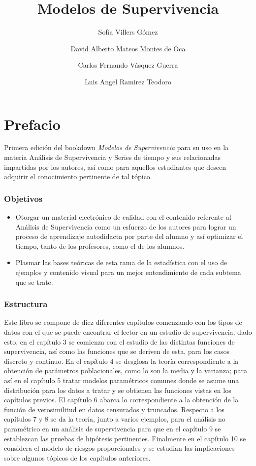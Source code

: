 \documentclass[
  a4paper,
  oneside,
  openany]{book}
\title{Modelos de Supervivencia}
\author{Sofía Villers Gómez \and David Alberto Mateos Montes de Oca \and Carlos Fernando Vásquez Guerra \and Luis Angel Ramirez Teodoro}
\date{}
\begin{document}
\maketitle

{
\setcounter{tocdepth}{2}
\tableofcontents
}
\hypertarget{prefacio}{%
\chapter*{Prefacio}\label{prefacio}}


Primera edición del bookdown \emph{Modelos de Supervivencia} para su uso en la materia Análisis de Supervivencia y Series de tiempo y sus relacionadas impartidas por los autores, así como para aquellos estudiantes que deseen adquirir el conocimiento pertinente de tal tópico.

\hypertarget{objetivos}{%
\subsection*{Objetivos}\label{objetivos}}


\begin{itemize}
\item
  Otorgar un material electrónico de calidad con el contenido referente al Análisis de Supervivencia como un esfuerzo de los autores para lograr un proceso de aprendizaje autodidacta por parte del alumno y así optimizar el tiempo, tanto de los profesores, como el de los alumnos.
\item
  Plasmar las bases teóricas de esta rama de la estadística con el uso de ejemplos y contenido visual para un mejor entendimiento de cada subtema que se trate.
\end{itemize}

\hypertarget{estructura}{%
\subsection*{Estructura}\label{estructura}}


Este libro se compone de diez diferentes capítulos comenzando con los tipos de datos con el que se puede encontrar el lector en un estudio de supervivencia, dado esto, en el capítulo 3 se comienza con el estudio de las distintas funciones de supervivencia, así como las funciones que se deriven de esta, para los casos discreto y continuo. En el capítulo 4 se desglosa la teoría correspondiente a la obtención de parámetros poblacionales, como lo son la media y la varianza; para así en el capítulo 5 tratar modelos paramétricos comunes donde se asume una distribución para los datos a tratar y se obtienen las funciones vistas en los capítulos previos. El capítulo 6 abarca lo correspondiente a la obtención de la función de verosimilitud en datos censurados y truncados. Respecto a los capítulos 7 y 8 se da la teoría, junto a varios ejemplos, para el análisis no paramétrico en un análisis de supervivencia para que en el capítulo 9 se establezcan las pruebas de hipótesis pertinentes. Finalmente en el capítulo 10 se considera el modelo de riesgos proporcionales y se estudian las implicaciones sobre algunos tópicos de los capítulos anteriores.
\end{document}
